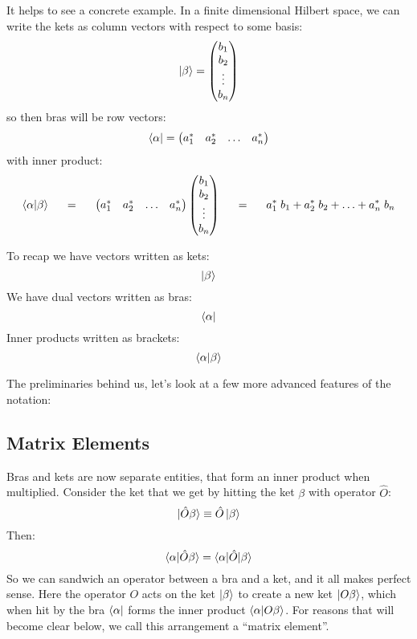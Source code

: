 \documentclass[12pt]{book}
\begin{document}
It helps to see a concrete example.  In a finite dimensional Hilbert space, we can write the kets as column vectors with respect to some basis:
$$\ket{\beta} =
\begin{pmatrix}
           b_{1} \\
           b_{2} \\
           \vdots \\
           b_{n}
\end{pmatrix}
$$
so then bras will be row vectors:
$$\bra{\alpha} =
\begin{pmatrix}
a_{1}^* & a_{2}^* & \ldots & a_{n}^*\\
\end{pmatrix}
$$
with inner product:
$$
\braket{\alpha|\beta}
\hspace{0.5cm} = \hspace{0.5cm}
\begin{pmatrix}
a_{1}^* & a_{2}^* & \ldots & a_{n}^*\\
\end{pmatrix}
\begin{pmatrix}
           b_{1} \\
           b_{2} \\
           \vdots \\
           b_{n}
\end{pmatrix}
\hspace{0.5cm} = \hspace{0.5cm} a_1^* \; b_{1} + a_2^* \; b_{2} + \ldots + a_n^* \; b_{n}\\
$$

To recap we have vectors written as kets:
$$\ket{\beta}$$
We have dual vectors written as bras:
$$\bra{\alpha}$$
Inner products written as brackets:
$$\braket{\alpha|\beta}$$


The preliminaries behind us, let's look at a few more advanced features of the notation:

\subsection{Matrix Elements}

Bras and kets are now separate entities, that form an inner product when multiplied.  Consider the ket that we get by hitting the ket $\beta$ with operator $\hat{O}$:
$$\ket{\hat{O}\beta} \equiv \hat{O} \ket{\beta}$$
Then:
$$\braket{\alpha|\hat{O}\beta} = \braket{\alpha|\hat{O}|\beta}$$
So we can sandwich an operator between a bra and a ket, and it all makes perfect sense.  Here the operator $O$ acts on the ket $\ket{\beta}$ to create a new ket $\ket{O\beta}$, which when hit by the bra $\bra{\alpha}$ forms the inner product $\braket{\alpha|O\beta}$.  For reasons that will become clear below, we call this arrangement a ``matrix element''.
\end{document}
